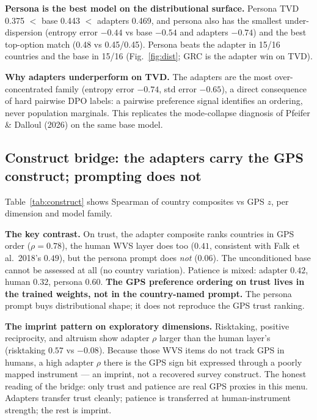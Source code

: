\documentclass[11pt]{article}
\begin{document}
\textbf{Persona is the best model on the distributional surface.} Persona TVD 0.375 $<$ base 0.443 $<$ adapters 0.469, and persona also has the smallest under-dispersion (entropy error $-0.44$ vs base $-0.54$ and adapters $-0.74$) and the best top-option match (0.48 vs 0.45/0.45). Persona beats the adapter in 15/16 countries and the base in 15/16 (Fig.~\ref{fig:dist}; GRC is the adapter win on TVD).

\textbf{Why adapters underperform on TVD.} The adapters are the most over-concentrated family (entropy error $-0.74$, std error $-0.65$), a direct consequence of hard pairwise DPO labels: a pairwise preference signal identifies an ordering, never population marginals. This replicates the mode-collapse diagnosis of Pfeifer \& Dalloul (2026) on the same base model.

\subsection{Construct bridge: the adapters carry the GPS construct; prompting does not}
\label{sec:bridge}
Table~\ref{tab:construct} shows Spearman of country composites vs GPS $z$, per dimension and model family.

\begin{table}[ht]
\centering
\caption{Construct bridge: Spearman $\rho$ of country composite vs GPS country $z$-score. Human layer n=42; adapter and persona layers n=16. ``---'' = undefined (single fixed distribution, no cross-country variation).}
\label{tab:construct}

\end{table}

\textbf{The key contrast.} On trust, the adapter composite ranks countries in GPS order ($\rho=0.78$), the human WVS layer does too ($0.41$, consistent with Falk et al.\ 2018's $0.49$), but the persona prompt does \emph{not} ($0.06$). The unconditioned base cannot be assessed at all (no country variation). Patience is mixed: adapter $0.42$, human $0.32$, persona $0.60$. \textbf{The GPS preference ordering on trust lives in the trained weights, not in the country-named prompt.} The persona prompt buys distributional shape; it does not reproduce the GPS trust ranking.

\textbf{The imprint pattern on exploratory dimensions.} Risktaking, positive reciprocity, and altruism show adapter $\rho$ larger than the human layer's (risktaking $0.57$ vs $-0.08$). Because those WVS items do not track GPS in humans, a high adapter $\rho$ there is the GPS sign bit expressed through a poorly mapped instrument --- an imprint, not a recovered survey construct. The honest reading of the bridge: only trust and patience are real GPS proxies in this menu. Adapters transfer trust cleanly; patience is transferred at human-instrument strength; the rest is imprint.
\end{document}
